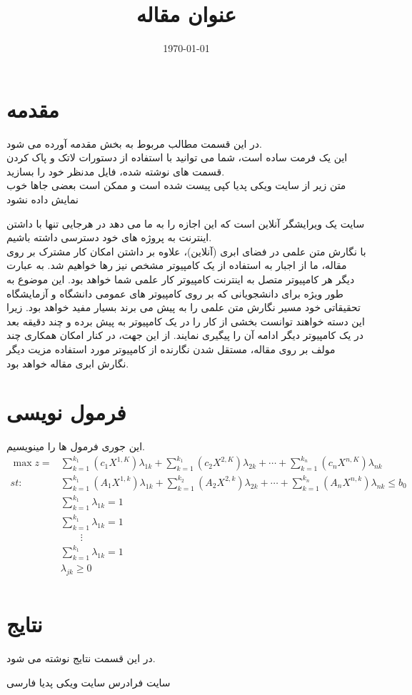 \documentclass[12pt,onecolumn,a4paper]{article}
\begin{document}
    \title{عنوان مقاله}
    \author{}
    \date{\today}
    \maketitle


    \section{مقدمه}
    در این قسمت مطالب مربوط به بخش مقدمه آورده می شود.\\
    این یک فرمت ساده است، شما می توانید با استفاده از دستورات لاتک و پاک کردن قسمت های نوشته شده، فایل مدنظر خود را بسازید.\\
    متن زیر از سایت ویکی پدیا کپی پیست شده است و ممکن است بعضی جاها خوب نمایش داده نشود


    سایت  یک ویرایشگر آنلاین \lr{\LaTeX{}} است که این اجازه را به ما می دهد در هرجایی تنها با داشتن اینترنت به پروژه های خود دسترسی داشته باشیم.\\
    با نگارش متن علمی در فضای ابری (آنلاین)، علاوه بر داشتن امکان کار مشترک بر روی مقاله، ما از اجبار به استفاده از یک کامپیوتر مشخص نیز رها خواهیم شد. به عبارت دیگر هر کامپیوتر متصل به اینترنت کامپیوتر کار علمی شما خواهد بود. این موضوع به طور ویژه برای دانشجویانی که بر روی کامپیوتر های عمومی دانشگاه و آزمایشگاه تحقیقاتی خود مسیر نگارش متن علمی را به پیش می برند بسیار مفید خواهد بود. زیرا این دسته خواهند توانست بخشی از کار را در یک کامپیوتر به پیش برده و چند دقیقه بعد در یک کامپیوتر دیگر ادامه آن را پیگیری نمایند. از این جهت، در کنار امکان همکاری چند مولف بر روی مقاله، مستقل شدن نگارنده از کامپیوتر مورد استفاده مزیت دیگر نگارش ابری مقاله خواهد بود.\\

    \section{فرمول نویسی}
    این جوری فرمول ها را مینویسیم.
    \begin{align*}
        \max z =&\sum_{k=1}^{k_1}(c_{1}X^{1,K})\lambda_{1k}+\sum_{k=1}^{k_1}(c_{2}X^{2,K})\lambda_{2k}+\cdots+\sum_{k=1}^{k_n}(c_{n}X^{n,K})\lambda_{nk} \\
        st:\qquad&\sum_{k=1}^{k_1} (A_{1}X^{1,k})\lambda_{1k}+\sum_{k=1}^{k_2}(A_{2}X^{2,k})\lambda_{2k}+\cdots+\sum_{k=1}^{k_n}(A_{n}X^{n,k})\lambda_{nk}\leq b_{0} \\
        &\sum_{k=1}^{k_1}\lambda_{1k}=1\\
        &\sum_{k=1}^{k_1}\lambda_{1k}=1\\
        &\qquad\vdots\\
        &\sum_{k=1}^{k_1}\lambda_{1k}=1\\
        &\lambda_{jk}\geq 0\\
    \end{align*}


    \section{نتایج}
    در این قسمت نتایج نوشته می شود.\\


    \begin{thebibliography}{99}
        \bibitem{}
        سایت فرادرس
        \bibitem{}
        سایت ویکی پدیا فارسی


    \end{thebibliography}
\end{document}
